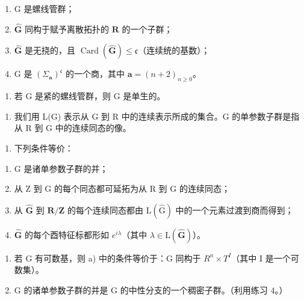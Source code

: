 \begin{enumerate}
\def\labelenumi{(\roman{enumi})}
\item
  G 是螺线管群；
\item
  \(\widehat{\mathbf{G}}\) 同构于赋予离散拓扑的 \(\mathbf{R}\) 的一个子群；
\item
  \(\widehat{\mathbf{G}}\) 是无挠的，且 \(\operatorname{Card}(\widehat{\mathbf{G}}) \leqslant \mathfrak{c}\)（连续统的基数）；
\item
  G 是 \((\Sigma_{\boldsymbol{a}})^{\mathfrak{c}}\) 的一个商，其中 \(\boldsymbol{a}=(n+2)_{n\geqslant0}\)。
\end{enumerate}

\begin{enumerate}
\def\labelenumi{\alph{enumi})}
\setcounter{enumi}{4}
\tightlist
\item
  若 G 是紧的螺线管群，则 G 是单生的。
\end{enumerate}

\begin{enumerate}
\def\labelenumi{\arabic{enumi})}
\setcounter{enumi}{10}
\tightlist
\item
  我们用 L(G) 表示从 G 到 R 中的连续表示所成的集合。G 的单参数子群是指从 R 到 G 中的连续同态的像。
\end{enumerate}

\begin{enumerate}
\def\labelenumi{\alph{enumi})}
\tightlist
\item
  下列条件等价：
\end{enumerate}

\begin{enumerate}
\def\labelenumi{(\roman{enumi})}
\item
  G 是诸单参数子群的并；
\item
  从 Z 到 G 的每个同态都可延拓为从 R 到 G 的连续同态；
\item
  从 \(\widehat{\mathbf{G}}\) 到 \(\mathbf{R} / \mathbf{Z}\) 的每个连续同态都由 \(\mathrm{L}(\widehat{\mathrm{G}})\) 中的一个元素过渡到商而得到；
\item
  \(\widehat{\mathbf{G}}\) 的每个酉特征标都形如 \(e^{i\lambda}\)（其中 \(\lambda \in \mathrm{L}(\widehat{\mathbf{G}})\)）。
\end{enumerate}

\begin{enumerate}
\def\labelenumi{\alph{enumi})}
\setcounter{enumi}{1}
\item
  若 G 有可数基，则 a) 中的条件等价于：G 同构于 \(R^{n} \times T^{I}\)（其中 I 是一个可数集）。
\item
  G 的诸单参数子群的并是 G 的中性分支的一个稠密子群。（利用练习 4。）
\end{enumerate}

